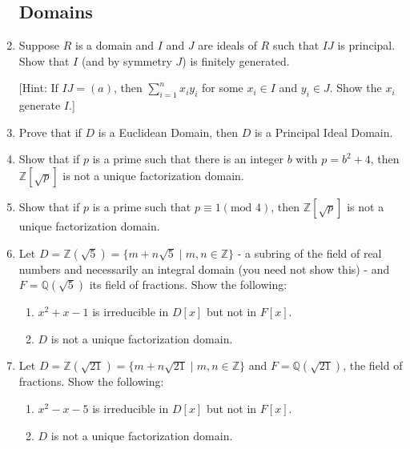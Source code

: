 \documentclass{article}
\theoremstyle{definition}
\newcommand{\m}[1]{(\text{mod }{#1})}
\newcommand{\Z}{\mathbb{Z}}
\newcommand{\Q}{\mathbb{Q}}
\begin{document}
\begin{enumerate}
        \subsection{Domains}

            \item Suppose $R$ is a domain and $I$ and $J$ are ideals of $R$ such that $IJ$ is principal. Show that $I$ (and by symmetry $J$) is finitely generated. 
            
                [Hint: If $IJ=(a)$, then $\sum_{i=1}^n x_iy_i$ for some $x_i\in I$ and $y_i\in J$. Show the $x_i$ generate $I$.]
            
            \item Prove that if $D$ is a Euclidean Domain, then $D$ is a Principal Ideal Domain.
            
            \item Show that if $p$ is a prime such that there is an integer $b$ with $p=b^2+4$, then $\Z[\sqrt{p}]$ is not a unique factorization domain.
            
            \item Show that if $p$ is a prime such that $p\equiv 1 \m{4}$, then $\Z[\sqrt{p}]$ is not a unique factorization domain.
            
            \item Let $D=\Z(\sqrt{5})=\{m+n\sqrt{5}\mid m,n\in \Z\}$ - a subring of the field of real numbers and necessarily an integral domain (you need not show this) - and $F=\Q(\sqrt{5})$ its field of fractions. Show the following:
            
            \begin{enumerate}
                \item $x^2+x-1$ is irreducible in $D[x]$ but not in $F[x]$.
                \item $D$ is not a unique factorization domain.
            \end{enumerate}

            \item Let $D=\Z(\sqrt{21})=\{m+n\sqrt{21}\mid m,n\in \Z\}$ and $F=\Q(\sqrt{21})$, the field of fractions. Show the following:
            
            \begin{enumerate}
                \item $x^2-x-5$ is irreducible in $D[x]$ but not in $F[x]$.
                \item $D$ is not a unique factorization domain.
            \end{enumerate}


\end{enumerate}
\end{document}
